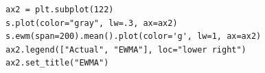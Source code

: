 \begin{lstlisting}
ax2 = plt.subplot(122)
s.plot(color="gray", lw=.3, ax=ax2)
s.ewm(span=200).mean().plot(color='g', lw=1, ax=ax2)
ax2.legend(["Actual", "EWMA"], loc="lower right")
ax2.set_title("EWMA")
\end{lstlisting}

